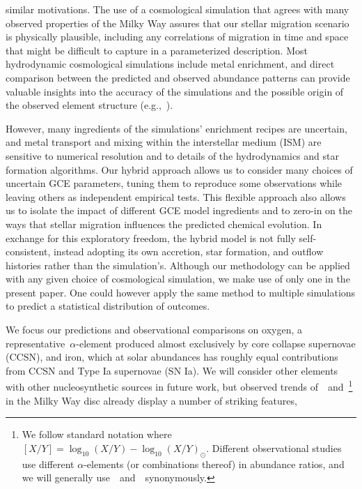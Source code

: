 similar motivations. 
The use of a cosmological simulation that agrees with many observed properties 
of the Milky Way assures that our stellar migration scenario is physically 
plausible, including any correlations of migration in time and space that might 
be difficult to capture in a parameterized description. 
Most hydrodynamic cosmological simulations include metal enrichment, and direct 
comparison between the predicted and observed abundance patterns can provide 
valuable insights into the accuracy of the simulations and the possible origin 
of the observed element structure (e.g.,~\citealt{Mackereth2018, Grand2018, 
Buck2020b, Vincenzo2020, Buck2021}). 
\par 
However, many ingredients of the simulations' enrichment recipes are 
uncertain, and metal transport and mixing within the interstellar medium (ISM) 
are sensitive to numerical resolution and to details of the hydrodynamics and 
star formation algorithms. 
Our hybrid approach allows us to consider many 
choices of uncertain GCE parameters, tuning them to reproduce some 
observations while leaving others as independent empirical tests. 
This flexible approach also allows us to isolate the impact of different 
GCE model ingredients and to zero-in on the ways that stellar migration 
influences the predicted chemical evolution. 
In exchange for this exploratory freedom, the hybrid model is not fully 
self-consistent, instead adopting its own accretion, star formation, and 
outflow histories rather than the simulation's. Although our methodology can 
be applied with any given choice of cosmological simulation, we make use of 
only one in the present paper. 
One could however apply the same method to multiple simulations to 
predict a statistical distribution of outcomes. 
\par 
We focus our predictions and observational comparisons on oxygen, a 
representative~$\alpha$-element produced almost exclusively by core 
collapse supernovae (CCSN), and iron, which at solar abundances has roughly 
equal contributions from CCSN and Type Ia supernovae (SN Ia). We will consider 
other elements with other nucleosynthetic sources in future work, but 
observed trends of~\feh~and~\afe\footnote{
	We follow standard notation where $[X/Y] = \log_{10}(X/Y) - 
	\log_{10}(X/Y)_\odot$. Different observational studies use different 
	$\alpha$-elements (or combinations thereof) in abundance ratios, and we 
	will generally use~\ofe~and~\afe~synonymously. 
} in the Milky Way disc already display a number of striking features, 

